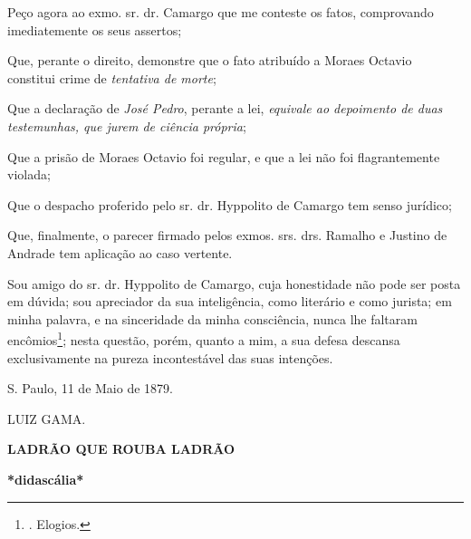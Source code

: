 Peço agora ao exmo. sr. dr. Camargo que me conteste os fatos,
comprovando imediatemente os seus assertos;

Que, perante o direito, demonstre que o fato atribuído a Moraes Octavio
constitui crime de \emph{tentativa de morte};

Que a declaração de \emph{José Pedro}, perante a lei, \emph{equivale ao
depoimento de duas testemunhas, que jurem de ciência própria};

Que a prisão de Moraes Octavio foi regular, e que a lei não foi
flagrantemente violada;

Que o despacho proferido pelo sr. dr. Hyppolito de Camargo tem senso
jurídico;

Que, finalmente, o parecer firmado pelos exmos. srs. drs. Ramalho e
Justino de Andrade tem aplicação ao caso vertente.

Sou amigo do sr. dr. Hyppolito de Camargo, cuja honestidade não pode ser
posta em dúvida; sou apreciador da sua inteligência, como literário e
como jurista; em minha palavra, e na sinceridade da minha consciência,
nunca lhe faltaram encômios\footnote{. Elogios.};
nest\protect\hypertarget{Secao_Sem_Titulo-36}{}{}a questão, porém,
quanto a mim, a sua defesa descansa exclusivamente na pureza
incontestável das suas intenções.

S. Paulo, 11 de Maio de 1879.

LUIZ GAMA.

\protect\hypertarget{Secao_Sem_Titulo-37}{}{}\textbf{LADRÃO QUE ROUBA
LADRÃO}

\textbf{*didascália*}

